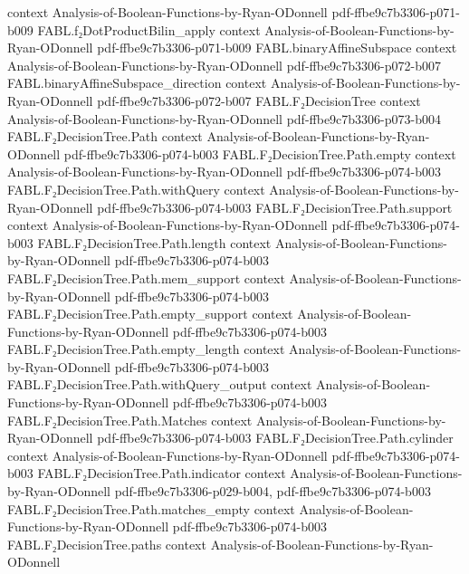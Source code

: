 \begin{theorem}
  {context}
  {Analysis-of-Boolean-Functions-by-Ryan-ODonnell}
  {pdf-ffbe9c7b3306-p071-b009}
\proofstep
  {FABL.f₂DotProductBilin_apply}
  {context}
  {Analysis-of-Boolean-Functions-by-Ryan-ODonnell}
  {pdf-ffbe9c7b3306-p071-b009}
\proofstep
  {FABL.binaryAffineSubspace}
  {context}
  {Analysis-of-Boolean-Functions-by-Ryan-ODonnell}
  {pdf-ffbe9c7b3306-p072-b007}
\proofstep
  {FABL.binaryAffineSubspace_direction}
  {context}
  {Analysis-of-Boolean-Functions-by-Ryan-ODonnell}
  {pdf-ffbe9c7b3306-p072-b007}
\proofstep
  {FABL.F₂DecisionTree}
  {context}
  {Analysis-of-Boolean-Functions-by-Ryan-ODonnell}
  {pdf-ffbe9c7b3306-p073-b004}
\proofstep
  {FABL.F₂DecisionTree.Path}
  {context}
  {Analysis-of-Boolean-Functions-by-Ryan-ODonnell}
  {pdf-ffbe9c7b3306-p074-b003}
\proofstep
  {FABL.F₂DecisionTree.Path.empty}
  {context}
  {Analysis-of-Boolean-Functions-by-Ryan-ODonnell}
  {pdf-ffbe9c7b3306-p074-b003}
\proofstep
  {FABL.F₂DecisionTree.Path.withQuery}
  {context}
  {Analysis-of-Boolean-Functions-by-Ryan-ODonnell}
  {pdf-ffbe9c7b3306-p074-b003}
\proofstep
  {FABL.F₂DecisionTree.Path.support}
  {context}
  {Analysis-of-Boolean-Functions-by-Ryan-ODonnell}
  {pdf-ffbe9c7b3306-p074-b003}
\proofstep
  {FABL.F₂DecisionTree.Path.length}
  {context}
  {Analysis-of-Boolean-Functions-by-Ryan-ODonnell}
  {pdf-ffbe9c7b3306-p074-b003}
\proofstep
  {FABL.F₂DecisionTree.Path.mem_support}
  {context}
  {Analysis-of-Boolean-Functions-by-Ryan-ODonnell}
  {pdf-ffbe9c7b3306-p074-b003}
\proofstep
  {FABL.F₂DecisionTree.Path.empty_support}
  {context}
  {Analysis-of-Boolean-Functions-by-Ryan-ODonnell}
  {pdf-ffbe9c7b3306-p074-b003}
\proofstep
  {FABL.F₂DecisionTree.Path.empty_length}
  {context}
  {Analysis-of-Boolean-Functions-by-Ryan-ODonnell}
  {pdf-ffbe9c7b3306-p074-b003}
\proofstep
  {FABL.F₂DecisionTree.Path.withQuery_output}
  {context}
  {Analysis-of-Boolean-Functions-by-Ryan-ODonnell}
  {pdf-ffbe9c7b3306-p074-b003}
\proofstep
  {FABL.F₂DecisionTree.Path.Matches}
  {context}
  {Analysis-of-Boolean-Functions-by-Ryan-ODonnell}
  {pdf-ffbe9c7b3306-p074-b003}
\proofstep
  {FABL.F₂DecisionTree.Path.cylinder}
  {context}
  {Analysis-of-Boolean-Functions-by-Ryan-ODonnell}
  {pdf-ffbe9c7b3306-p074-b003}
\proofstep
  {FABL.F₂DecisionTree.Path.indicator}
  {context}
  {Analysis-of-Boolean-Functions-by-Ryan-ODonnell}
  {pdf-ffbe9c7b3306-p029-b004,
    pdf-ffbe9c7b3306-p074-b003}
\proofstep
  {FABL.F₂DecisionTree.Path.matches_empty}
  {context}
  {Analysis-of-Boolean-Functions-by-Ryan-ODonnell}
  {pdf-ffbe9c7b3306-p074-b003}
\proofstep
  {FABL.F₂DecisionTree.paths}
  {context}
  {Analysis-of-Boolean-Functions-by-Ryan-ODonnell}

\end{theorem}
